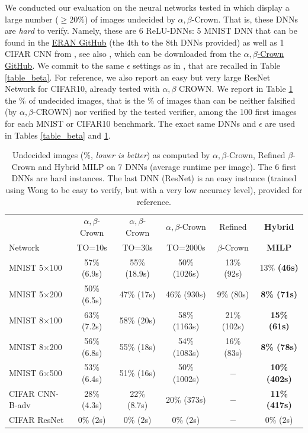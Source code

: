 We conducted our evaluation on the neural networks tested in \cite{crown}
which display a large number ($\geq 20\%$) of images undecided  by $\alpha,\beta$-Crown. That is, these DNNs are {\em hard} to verify. Namely, these are 6 ReLU-DNNs: 5 MNIST DNN that can be found in the \href{https://github.com/eth-sri/eran}{ERAN GitHub} 
(the 4th to the 8th DNNs provided) as well as 1 CIFAR CNN from 
\cite{AdversarialTrainingAndProvableDefenses}, see also \cite{SDPFI}, 
which can be downloaded from the \href{https://github.com/Verified-Intelligence/alpha-beta-CROWN}{$\alpha,\beta$-Crown GitHub}. 
We commit to the same $\epsilon$ settings as in \cite{crown}, that are recalled in Table \ref{table_beta}. 
For reference, we also report an easy but very large ResNet Network for CIFAR10, already tested with $\alpha,\beta$ CROWN. 
We report in Table \ref{table_hybrid} the $\%$ of undecided images, that is the $\%$ of images than can be neither falsified (by $\alpha,\beta$-CROWN) nor verified by the tested verifier, among the 100 first images for each MNIST or CIFAR10 benchmark. 
The exact same DNNs and $\epsilon$ are used in Tables \ref{table_beta} and \ref{table_hybrid}.


\begin{table}[t!]
	\centering
	\begin{tabular}{||l||c|c|c||c||c||}
		\hline \hline
		 & $\alpha,\beta$-Crown & $\alpha,\beta$-Crown & $\alpha,\beta$-Crown & Refined & \bf Hybrid \\ 
		 Network & TO=10s & TO=30s & TO=2000s & $\beta$-Crown & \bf MILP \\ 
		\hline
		MNIST 5$\times$100 & 57\% (6.9s) & 55\% (18.9s) & 50\% (1026s) & 13\% 
		(92s) & 13\% \bf (46s) \\ \hline
		MNIST 5$\times$200 & 50\% (6.5s) & 47\% (17s) & 46\% (930s) & 9\% (80s) & \bf 8\% (71s) \\ \hline
		MNIST 8$\times$100 & 63\% (7.2s) & 58\% (20s) & 58\% (1163s) & 21\% (102s) & \bf 15\% (61s) \\ \hline
		MNIST 8$\times$200 & 56\% (6.8s) & 55\% (18s) & 54\% (1083s) & 16\% (83s) & \bf 8\% (78s) \\ \hline
		MNIST 6$\times$500 & 53\% (6.4s) & 51\% (16s) & 50\% (1002s) & $-$ & 
		\bf 10\% (402s) \\ \hline
		CIFAR CNN-B-adv & 28\% (4.3s) & 22\% (8.7s) & 20\% (373s) & $-$ & \bf 11\% (417s) \\ \hline \hline
		CIFAR ResNet & 0\% (2s) & 0\% (2s) & 0\% (2s) & $-$ & 0\% (2s) \\ \hline \hline
	\end{tabular}
	\caption{Undecided images ($\%$, {\em lower is better}) as computed by $\alpha,\beta$-Crown, Refined $\beta$-Crown and Hybrid MILP on 7 DNNs (average runtime per image). The 6 first DNNs are hard instances. The last DNN (ResNet) is an easy instance (trained using Wong to be easy to verify, but with a very low accuracy level), provided for reference.}
	\label{table_hybrid}
	\end{table}

